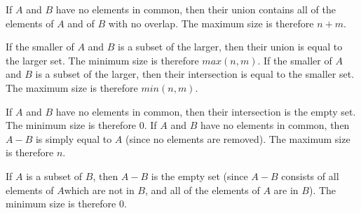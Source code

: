 \documentclass[solution, letterpaper]{cs20}
\begin{document}
\begin{solution}
\subsolution If $A$ and $B$ have no elements in common, then their union contains all of the elements of $A$ and of $B$ with no overlap. The maximum size is therefore $n + m$. 

\noindent If the smaller of $A$ and $B$ is a subset of the larger, then their union is equal to the larger set. The minimum size is therefore $max(n, m)$.
\subsolution If the smaller of $A$ and $B$ is a subset of the larger, then their intersection is equal to the smaller set. The maximum size is therefore $min(n, m)$.

\noindent If $A$ and $B$ have no elements in common, then their intersection is the empty set. The minimum size is therefore 0.
\subsolution If $A$ and $B$ have no elements in common, then $A - B$ is simply equal to $A$ (since no elements are removed). The maximum size is therefore $n$.

\noindent If $A$ is a subset of $B$, then $A - B$ is the empty set (since $A - B$ consists of all elements of $A$which are not in $B$, and all of the elements of $A$ are in $B$). The minimum size is therefore 0.
\end{solution}
\end{document}
